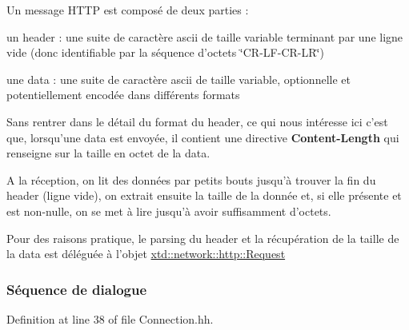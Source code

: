 Un message H\-T\-T\-P est composé de deux parties \-:
\begin{DoxyItemize}
\item un header \-: une suite de caractère ascii de taille variable terminant par une ligne vide (donc identifiable par la séquence d'octets \char`\"{}\-C\-R-\/\-L\-F-\/\-C\-R-\/\-L\-R\char`\"{})
\item une data \-: une suite de caractère ascii de taille variable, optionnelle et potentiellement encodée dans différents formats
\end{DoxyItemize}

Sans rentrer dans le détail du format du header, ce qui nous intéresse ici c'est que, lorsqu'une data est envoyée, il contient une directive {\bfseries Content-\/\-Length} qui renseigne sur la taille en octet de la data.

A la réception, on lit des données par petits bouts jusqu'à trouver la fin du header (ligne vide), on extrait ensuite la taille de la donnée et, si elle présente et est non-\/nulle, on se met à lire jusqu'à avoir suffisamment d'octets.

Pour des raisons pratique, le parsing du header et la récupération de la taille de la data est déléguée à l'objet \hyperlink{classxtd_1_1network_1_1http_1_1Request}{xtd\-::network\-::http\-::\-Request}

\subsubsection*{Séquence de dialogue }

 

Definition at line 38 of file Connection.\-hh.



